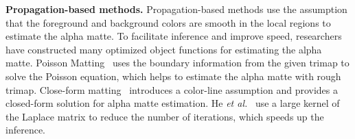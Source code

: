 \documentclass[10pt,twocolumn,letterpaper]{article}
\begin{document}
\noindent \textbf{Propagation-based methods.}
Propagation-based methods \cite{sun2004poisson,grady2005random,levin2008a,levin2008spectral,he2010fast,chen2013knn,li2013motion,aksoy2017designing} use the assumption that the foreground and background colors are smooth in the local regions to estimate the alpha matte.
To facilitate inference and improve speed, researchers have constructed many optimized object functions for estimating the alpha matte.
Poisson Matting~\cite{sun2004poisson} uses the boundary information from the given trimap to solve the Poisson equation, which helps to estimate the alpha matte with rough trimap.
Close-form matting~\cite{levin2008a} introduces a color-line assumption and provides a closed-form solution for alpha matte estimation.
He \emph{et al.}~\cite{he2010fast} use a large kernel of the Laplace matrix to reduce the number of iterations, which speeds up the inference.
\end{document}
